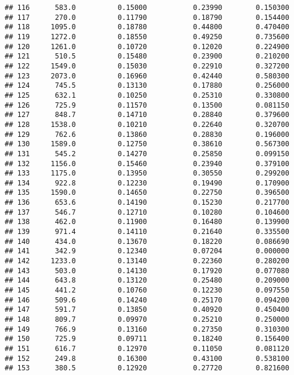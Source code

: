 \documentclass[
]{article}
\begin{document}
\begin{verbatim}
## 116      583.0          0.15000           0.23990        0.150300
## 117      270.0          0.11790           0.18790        0.154400
## 118     1095.0          0.18780           0.44800        0.470400
## 119     1272.0          0.18550           0.49250        0.735600
## 120     1261.0          0.10720           0.12020        0.224900
## 121      510.5          0.15480           0.23900        0.210200
## 122     1549.0          0.15030           0.22910        0.327200
## 123     2073.0          0.16960           0.42440        0.580300
## 124      745.5          0.13130           0.17880        0.256000
## 125      632.1          0.10250           0.25310        0.330800
## 126      725.9          0.11570           0.13500        0.081150
## 127      848.7          0.14710           0.28840        0.379600
## 128     1538.0          0.10210           0.22640        0.320700
## 129      762.6          0.13860           0.28830        0.196000
## 130     1589.0          0.12750           0.38610        0.567300
## 131      545.2          0.14270           0.25850        0.099150
## 132     1156.0          0.15460           0.23940        0.379100
## 133     1175.0          0.13950           0.30550        0.299200
## 134      922.8          0.12230           0.19490        0.170900
## 135     1590.0          0.14650           0.22750        0.396500
## 136      653.6          0.14190           0.15230        0.217700
## 137      546.7          0.12710           0.10280        0.104600
## 138      462.0          0.11900           0.16480        0.139900
## 139      971.4          0.14110           0.21640        0.335500
## 140      434.0          0.13670           0.18220        0.086690
## 141      342.9          0.12340           0.07204        0.000000
## 142     1233.0          0.13140           0.22360        0.280200
## 143      503.0          0.14130           0.17920        0.077080
## 144      643.8          0.13120           0.25480        0.209000
## 145      441.2          0.10760           0.12230        0.097550
## 146      509.6          0.14240           0.25170        0.094200
## 147      591.7          0.13850           0.40920        0.450400
## 148      809.7          0.09970           0.25210        0.250000
## 149      766.9          0.13160           0.27350        0.310300
## 150      725.9          0.09711           0.18240        0.156400
## 151      616.7          0.12970           0.11050        0.081120
## 152      249.8          0.16300           0.43100        0.538100
## 153      380.5          0.12920           0.27720        0.821600

\end{verbatim}
\end{document}
